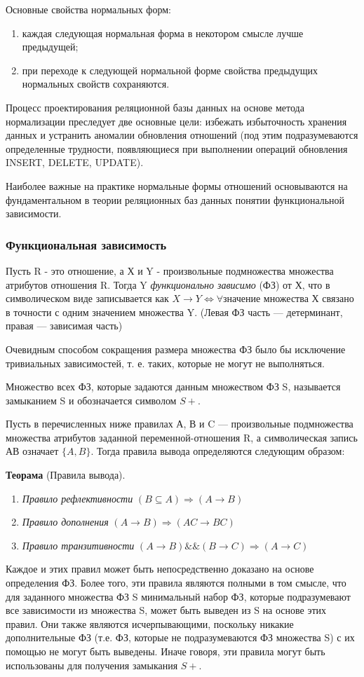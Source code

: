 Основные свойства нормальных форм:
\begin{enumerate}
	\item каждая следующая нормальная форма в некотором смысле лучше предыдущей;
	\item при переходе к следующей нормальной форме свойства предыдущих нормальных свойств сохраняются. 
\end{enumerate}

Процесс проектирования реляционной базы данных на основе метода нормализации преследует две основные цели: избежать избыточность хранения данных и устранить аномалии обновления отношений (под этим подразумеваются определенные трудности, появляющиеся при выполнении операций обновления INSERT, DELETE, UPDATE).

Наиболее важные на практике нормальные формы отношений основываются на фундаментальном в теории
реляционных баз данных понятии функциональной зависимости.

\subsubsection{Функциональная зависимость}

Пусть R - это отношение, а Х и Y - произвольные подмножества множества атрибутов отношения R. Тогда Y
\textit{функционально зависимо} (ФЗ) от Х, что в символическом виде записывается как $X \to Y \Leftrightarrow \forall$значение множества Х связано в точности с одним значением множества Y. (Левая ФЗ часть --- детерминант, правая --- зависимая часть)

Очевидным способом сокращения размера множества ФЗ было бы исключение тривиальных зависимостей, т. е. таких, которые не могут не выполняться.

Множество всех ФЗ, которые задаются данным множеством ФЗ S, называется замыканием S и обозначается символом $S+$.

Пусть в перечисленных ниже правилах А, В и C — произвольные подмножества множества атрибутов заданной переменной-отношения R, а символическая запись АВ означает $\{A, B\}$. Тогда правила
вывода определяются следующим образом:

\textbf{Теорама} (Правила вывода).
\begin{enumerate}
	\item \textit{Правило рефлективности} $(B \subseteq A) \Rightarrow (A \to B)$
	\item \textit{Правило дополнения} $(A \to B) \Rightarrow (AC \to BC)$
	\item \textit{Правило транзитивности} $(A \to B) \&\& (B \to C) \Rightarrow (A \to C)$
\end{enumerate}
Каждое и этих правил может быть непосредственно доказано на основе определения ФЗ. Более того, эти правила 
являются полными в том смысле, что для заданного множества ФЗ S минимальный набор ФЗ, которые подразумевают 
все зависимости из множества S, может быть выведен из S на основе этих правил. Они также являются 
исчерпывающими, поскольку никакие дополнительные ФЗ (т.е. ФЗ, которые не подразумеваются ФЗ множества S) с их 
помощью не могут быть выведены. Иначе говоря, эти правила могут быть использованы для получения замыкания $S+$.

